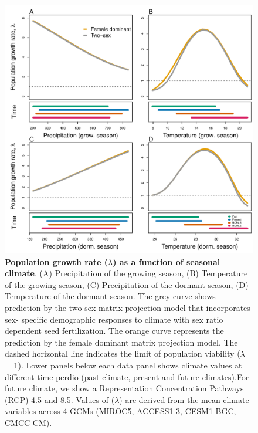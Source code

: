 \documentclass[12pt]{article}
\begin{document}
\begin{figure}[H]
  \begin{center}
    \includegraphics[width=0.85\linewidth]{Figures/lambda_past_present_future.pdf}
  \caption{\textbf{Population growth rate ($\lambda$) as a function of seasonal climate}.
(A) Precipitation of the growing season, (B) Temperature of the growing season, (C) Precipitation of the dormant season, (D) Temperature of the dormant season.
The grey curve shows prediction by the two-sex matrix projection model that incorporates sex- specific demographic responses to climate with sex ratio dependent seed fertilization.
The orange curve represents the prediction by the female dominant matrix projection model.
The dashed horizontal line indicates the limit of population viability ($\lambda$ = 1).
Lower panels below each data panel shows climate values at different time perdio (past climate, present and future climates).For future climate, we show a Representation Concentration Pathways (RCP) 4.5 and 8.5. Values of ($\lambda$) are derived from the mean climate variables across 4 GCMs (MIROC5, ACCESS1-3, CESM1-BGC, CMCC-CM).}
  \label{fig:lambda}
  \end{center}
\end{figure}
\end{document}
